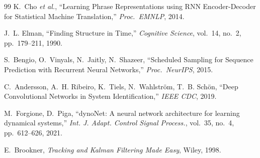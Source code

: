 \documentclass[conference]{IEEEtran}
\begin{document}
\begin{thebibliography}{99}
K.~Cho \textit{et al.}, ``Learning Phrase Representations using RNN
Encoder-Decoder for Statistical Machine Translation,''
\textit{Proc.\ EMNLP}, 2014.

J.~L. Elman, ``Finding Structure in Time,''
\textit{Cognitive Science}, vol.~14, no.~2, pp.~179--211, 1990.

S.~Bengio, O.~Vinyals, N.~Jaitly, N.~Shazeer,
``Scheduled Sampling for Sequence Prediction with Recurrent Neural
Networks,'' \textit{Proc.\ NeurIPS}, 2015.

C.~Andersson, A.~H. Ribeiro, K.~Tiels, N.~Wahlstr\"om,
T.~B. Sch\"on, ``Deep Convolutional Networks in System Identification,''
\textit{IEEE CDC}, 2019.

M.~Forgione, D.~Piga, ``dynoNet: A neural network architecture for
learning dynamical systems,'' \textit{Int. J. Adapt. Control Signal
Process.}, vol.~35, no.~4, pp.~612--626, 2021.

E.~Brookner, \textit{Tracking and Kalman Filtering Made Easy}, Wiley,
1998.

\end{thebibliography}
\end{document}
